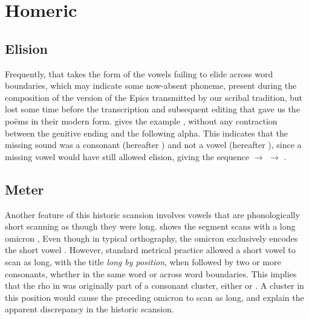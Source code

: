 \section{Homeric}\label{sec:Homeric}

\subsection{Elision}\label{subsec:Elision}
Frequently, that takes the form
of the vowels failing to elide across word boundaries, which may indicate some now-absent
phoneme, present during the composition of the version of the Epics transmitted by our
scribal tradition, but lost some time before the transcription and subsequent editing that gave
us the po\"ems in their modern form.  gives the example
,\autocite[\MakeUppercase{}.214]{Iliad_1999}
without any contraction between the genitive ending
 and the following alpha.
This indicates that the missing sound was a consonant (hereafter \w) and not
a vowel (hereafter \vowel), since a missing vowel would have still allowed elision,
giving the sequence  $\to$ 
$\to$ .

\subsection{Meter}\label{subsec:Meter}
Another feature of this historic scansion involves vowels
that are phonologically short scanning as though they were long.
 shows the segment  scans with a long omicron
,\autocite[\MakeUppercase{]}.306]{Iliad_1999}
Even though in typical orthography, the omicron  exclusively encodes the
short vowel .
However, standard metrical practice allowed a short vowel to scan as long, with the title
\textit{long by position},
when followed by two or more consonants, whether in the same word or across word boundaries. This implies
that the rho  in  was originally part of a consonant
cluster, either  or . A cluster in this position would cause the
preceding omicron  to scan as long, and explain the apparent discrepancy
in the historic scansion.

